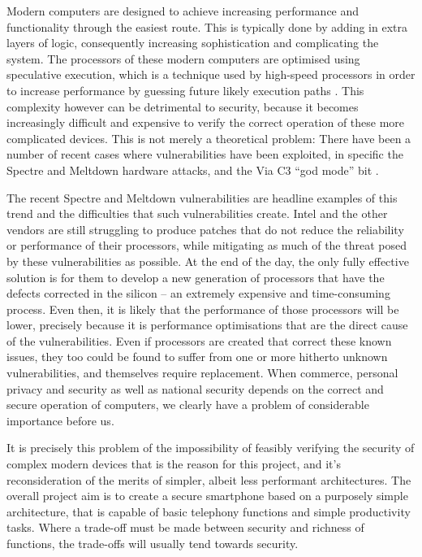         Modern computers are designed to achieve increasing performance and functionality through the easiest route.
        This is typically done by adding in extra layers of logic, consequently increasing sophistication and complicating the system.
        The processors of these modern computers are optimised using speculative execution, which is a technique used by high-speed processors in order to increase performance by guessing future likely execution paths \cite{RN16}.
        This complexity however can be detrimental to security, because it becomes increasingly difficult and expensive to verify the correct operation of these more complicated devices.
        This is not merely a theoretical problem: There have been a number of recent cases where vulnerabilities have been exploited, in specific the Spectre and Meltdown hardware attacks, and the Via C3 ``god mode'' bit .

        The recent Spectre  and Meltdown  vulnerabilities are headline examples of this trend and the difficulties that such vulnerabilities create.
        Intel and the other vendors are still struggling to produce patches that do not reduce the reliability or performance of their processors, while mitigating as much of the threat posed by these vulnerabilities as possible.
        At the end of the day, the only fully effective solution is for them to develop a new generation of processors that have the defects corrected in the silicon – an extremely expensive and time-consuming process.
        Even then, it is likely that the performance of those processors will be lower, precisely because it is performance optimisations that are the direct cause of the vulnerabilities.
        Even if processors are created that correct these known issues, they too could be found to suffer from one or more hitherto unknown vulnerabilities, and themselves require replacement.
        When commerce, personal privacy and security as well as national security depends on the correct and secure operation of computers, we clearly have a problem of considerable importance before us.

        It is precisely this problem of the impossibility of feasibly verifying the security of complex modern devices that is the reason for this project, and it's reconsideration of the merits of simpler, albeit less performant architectures.
The overall project aim is to create a secure smartphone based on a purposely simple architecture, that is capable of basic telephony functions and simple productivity tasks.
Where a trade-off must be made between security and richness of functions, the trade-offs will usually tend towards security.


